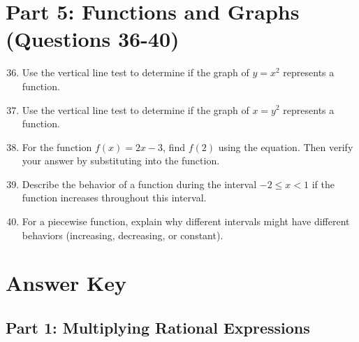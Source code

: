 \documentclass[12pt]{article}
\begin{document}
\section*{Part 5: Functions and Graphs (Questions 36-40)}

\begin{enumerate}
\setcounter{enumi}{35}

\item Use the vertical line test to determine if the graph of $y = x^2$ represents a function.

\item Use the vertical line test to determine if the graph of $x = y^2$ represents a function.

\item For the function $f(x) = 2x - 3$, find $f(2)$ using the equation. Then verify your answer by substituting into the function.

\item Describe the behavior of a function during the interval $-2 \leq x < 1$ if the function increases throughout this interval.

\item For a piecewise function, explain why different intervals might have different behaviors (increasing, decreasing, or constant).

\end{enumerate}

\newpage

\section*{Answer Key}

\subsection*{Part 1: Multiplying Rational Expressions}
\end{document}
